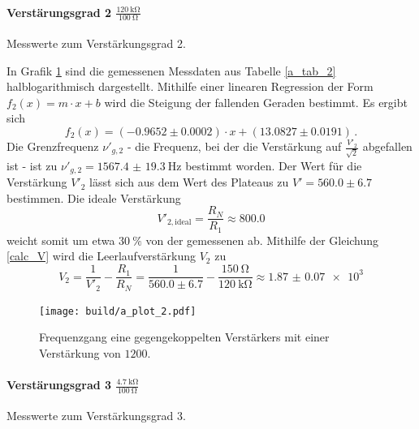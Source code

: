 \paragraph{Verstärungsgrad 2 $\frac{\SI{120}{\kilo\ohm}}{\SI{100}{\ohm}}$}

\begin{table}
\centering
\caption{Messwerte zum Verstärkungsgrad 2.}
    \label{tab:a_messwerte_2}
    
\end{table}

In Grafik \ref{fig:a_plot_2} sind die gemessenen Messdaten aus Tabelle \ref{a_tab_2} halblogarithmisch dargestellt.
Mithilfe einer linearen Regression der Form $f_2(x)=m \cdot x + b$ wird die Steigung der fallenden Geraden bestimmt.
Es ergibt sich
\begin{equation*}
	f_2(x) = (-0.9652\pm0.0002) \cdot x + (13.0827\pm0.0191)\,.
\end{equation*}
Die Grenzfrequenz $\nu'_{g,2}$ - die Frequenz, bei der die Verstärkung auf $\frac{V'_2}{\sqrt{2}}$ abgefallen ist - ist zu $\nu'_{g,2} = \SI{1567.4(193)}{\hertz}$ bestimmt worden.
Der Wert für die Verstärkung $V'_2$ lässt sich aus dem Wert des Plateaus zu $V'=560.0\pm6.7$ bestimmen.
Die ideale Verstärkung 
\begin{equation*}
    V'_{2,\text{ideal}} = \frac{R_N}{R_1} \approx 800.0
\end{equation*}
weicht somit um etwa $\SI{30}{\percent}$ von der gemessenen ab.
Mithilfe der Gleichung \eqref{calc_V} wird die Leerlaufverstärkung $V_2$ zu
\begin{equation*}
	V_2 = \frac{1}{V'_2} - \frac{R_1}{R_N} = \frac{1}{560.0\pm6.7} - \frac{\SI{150}{\ohm}}{\SI{120}{\kilo\ohm}} \approx 
    \num{1.87(7)e3}
\end{equation*}

\begin{figure}[h!]
    \centering
    \texttt{[image: build/a\_plot\_2.pdf]}
    \caption{Frequenzgang eine gegengekoppelten Verstärkers mit einer Verstärkung von $1200$.}
    \label{fig:a_plot_2}
\end{figure}

\paragraph{Verstärungsgrad 3 $\frac{\SI{4.7}{\kilo\ohm}}{\SI{100}{\ohm}}$}

\begin{table}
\centering
\caption{Messwerte zum Verstärkungsgrad 3.}
    \label{tab:a_messwerte_3}
    
\end{table}

